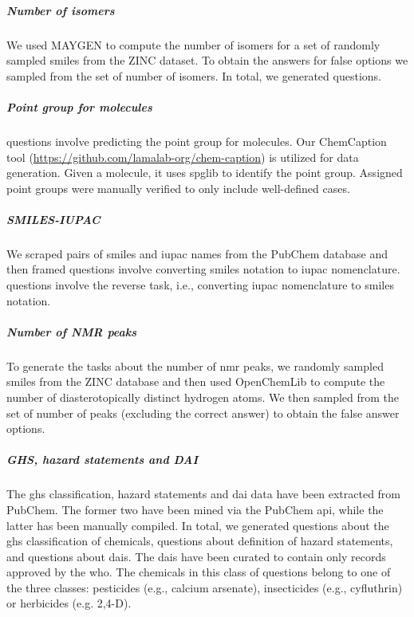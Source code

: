 \documentclass[11pt, oneside]{article}
\begin{document}
\subparagraph{Number of isomers}
We used MAYGEN\cite{Yirik_2021} to compute the number of isomers for a set of randomly sampled \gls{smiles} from the ZINC dataset.\cite{Irwin_2012}
To obtain the answers for false options we sampled from the set of number of isomers. In total, we generated  questions.

\subparagraph{Point group for molecules}
 questions involve predicting the point group for molecules. Our ChemCaption tool (\url{https://github.com/lamalab-org/chem-caption}) is utilized for data generation. 
Given a molecule, it uses spglib\cite{spglib} to identify the point group. 
Assigned point groups were manually verified to only include well-defined cases.

\subparagraph{SMILES-IUPAC}
We scraped pairs of \gls{smiles} and \gls{iupac} names from the PubChem database \cite{pubchem} and then framed  questions involve converting \gls{smiles} notation to \gls{iupac} nomenclature.
 questions involve the reverse task, i.e., converting \gls{iupac} nomenclature to \gls{smiles} notation.


\subparagraph{Number of NMR peaks} 
To generate the   tasks about the number of \gls{nmr} peaks, we randomly sampled \gls{smiles} from the ZINC database\cite{Irwin_2012} and then used OpenChemLib\cite{openchemlib} to compute the number of diasterotopically distinct hydrogen atoms. 
We then sampled from the set of number of peaks (excluding the correct answer) to obtain the false answer options.

\subparagraph{GHS, hazard statements and DAI}
The \gls{ghs} classification, hazard statements and \gls{dai} data have been extracted from PubChem.\cite{pubchem}
The former two have been mined via the PubChem \gls{api}, while the latter has been manually compiled. 
In total, we generated  questions about the \gls{ghs} classification of chemicals,  questions about definition of hazard statements, and  questions about \glspl{dai}.
The \glspl{dai} have been curated to contain only records approved by the \gls{who}.
The chemicals in this class of questions belong to one of the three classes: pesticides (e.g., calcium arsenate), insecticides (e.g., cyfluthrin) or herbicides (e.g. 2,4-D).
\end{document}
